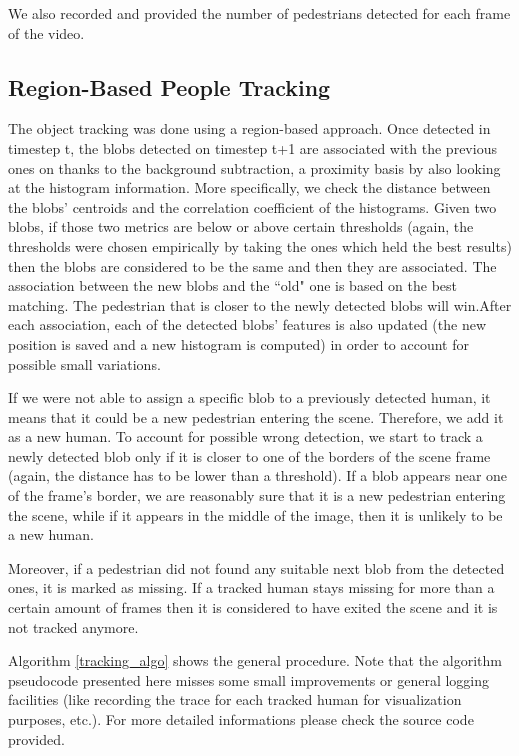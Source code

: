 \documentclass[runningheads]{llncs}
\begin{document}
We also recorded and provided the number of pedestrians detected for each frame of the video. 

\subsection{Region-Based People Tracking}

The object tracking was done using a region-based approach. Once detected in timestep t, the blobs detected on timestep t+1 are associated with the previous ones on thanks to the background subtraction, a proximity basis by also looking at the histogram information. More specifically, we check the distance between the blobs' centroids and the correlation coefficient of the histograms. Given two blobs, if those two metrics are below or above certain thresholds (again, the thresholds were chosen empirically by taking the ones which held the best results) then the blobs are considered to be the same and then they are associated. The association between the new blobs and the ``old" one is based on the best matching. The pedestrian that is closer to the newly detected blobs will win.After each association, each of the detected blobs' features is also updated (the new position is saved and a new histogram is computed) in order to account for possible small variations.

If we were not able to assign a specific blob to a previously detected human, it means that it could be a new pedestrian entering the scene. Therefore, we add it as a new human. To account for possible wrong detection, we start to track a newly detected blob only if it is closer to one of the borders of the scene frame (again, the distance has to be lower than a threshold). If a blob appears near one of the frame's border, we are reasonably sure that it is a new pedestrian entering the scene, while if it appears in the middle of the image, then it is unlikely to be a new human.

Moreover, if a pedestrian did not found any suitable next blob from the detected ones, it is marked as missing. If a tracked human stays missing for more than a certain amount of frames then it is considered to have exited the scene and it is not tracked anymore.

Algorithm \ref{tracking_algo} shows the general procedure. Note that the algorithm pseudocode presented here misses some small improvements or general logging facilities (like recording the trace for each tracked human for visualization purposes, etc.).
For more detailed informations please check the source code provided.
\end{document}
